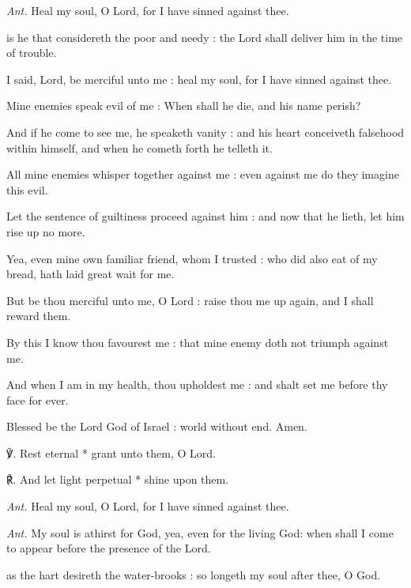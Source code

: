 \textit{Ant.} Heal my soul, {\dag} O Lord, for I have sinned against thee.\par
{} is he that considereth the poor and needy : the Lord shall deliver him in the time of trouble.\par
{}
I said, Lord, be merciful unto me : heal my soul, for I have sinned against thee.\par
{}Mine enemies speak evil of me : When shall he die, and his name perish?\par
{}And if he come to see me, he speaketh vanity : and his heart conceiveth falsehood within himself, and when he cometh forth he telleth it.\par
{}All mine enemies whisper together against me : even against me do they imagine this evil.\par
{}Let the sentence of guiltiness proceed against him : and now that he lieth, let him rise up no more.\par
{}Yea, even mine own familiar friend, whom I trusted : who did also eat of my bread, hath laid great wait for me.\par
{}But be thou merciful unto me, O Lord : raise thou me up again, and I shall reward them.\par
{}By this I know thou favourest me : that mine enemy doth not triumph against me.\par
{}And when I am in my health, thou upholdest me : and shalt set me before thy face for ever.\par
{}Blessed be the Lord God of Israel : world without end. Amen.\par
℣. Rest eternal * grant unto them, O Lord.\par
℟. And let light perpetual * shine upon them.\par\noindent
\textit{Ant.} Heal my soul, O Lord, for I have sinned against thee.\par
{}\par\noindent
\textit{Ant.} My soul is athirst for God, {\dag} yea, even for the living God: when shall I come to appear before the presence of the Lord.\par
{} as the hart desireth the water-brooks : so longeth my soul after thee, O God.\par
